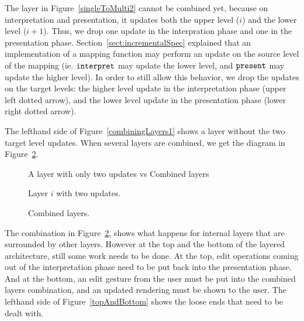 The layer in Figure~\ref{singleToMulti2} cannot be combined yet, because on interpretation and presentation, it updates both the upper level ($i$) and the lower level ($i+1$). Thus, we drop one update in the interpration phase and one in the presentation phase. Section~\ref{sect:incrementalSpec} explained that an implementation of a mapping function may perform an update on the source level of the mapping (ie. 
${\tt interpret}$ may update the lower level, and ${\tt present}$ may update the higher level). In order to still allow this behavior, we drop the updates on the target levels: the higher level update in the interpretation phase (upper left dotted arrow), and the lower level update in the presentation phase (lower right dotted arrow). 

\bc The lefthand side of \ec Figure~\ref{combiningLayers1} shows a layer without the two target level updates. When several layers are combined, we get the diagram in Figure~\ref{combiningLayers2}.

\bc
\begin{figure}\begin{small}\begin{center}\begin{center}
\end{center}
\caption{A layer with only two updates vs Combined layers}\label{combiningLayers} 
\end{center}\end{small}\end{figure}
\ec

\begin{figure}[h]
  \hfill
  \begin{minipage}[b]{.45\textwidth}
    \begin{center}  
      \caption{Layer $i$ with two updates.} \label{combiningLayers1}
    \end{center}
  \end{minipage}
  \hfill
  \begin{minipage}[b]{.45\textwidth}
    \begin{center}  
      \caption{Combined layers.} \label{combiningLayers2}
    \end{center}
  \end{minipage}
  \hfill
\end{figure}


The combination in Figure~\ref{combiningLayers2}, shows what happens for internal layers that are surrounded by other layers. However at the top and the bottom of the layered architecture, still some work needs to be done. At the top, edit operations coming out of the interpretation phase need to be put back into the presentation phase. And at the bottom, an edit gesture from the user must be put into the combined layers combination, and an updated rendering must be shown to the user. The lefthand side of Figure~\ref{topAndBottom} shows the loose ends that need to be dealt with.

